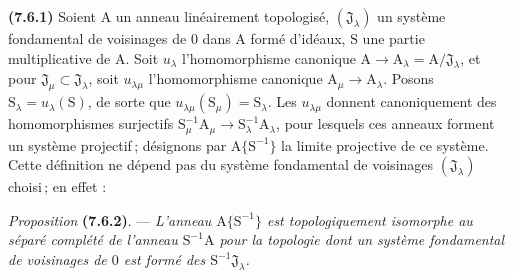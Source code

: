 \textbf{(7.6.1)} Soient $\mathrm{A}$ un anneau linéairement topologisé, $(\mathfrak{J}_\lambda)$ un système fondamental de voisinages de $0$ dans $\mathrm{A}$ formé d’idéaux, $\mathrm{S}$ une partie multiplicative de $\mathrm{A}$. Soit $u_\lambda$ l’homomorphisme canonique $\mathrm{A}\to \mathrm{A}_\lambda=\mathrm{A}/\mathfrak{J}_\lambda$, et pour $\mathfrak{J}_\mu\subset \mathfrak{J}_\lambda$, soit $u_{\lambda\mu}$ l’homomorphisme canonique $\mathrm{A}_\mu\to \mathrm{A}_\lambda$. Posons $\mathrm{S}_\lambda=u_\lambda(\mathrm{S})$, de sorte que $u_{\lambda\mu}(\mathrm{S}_\mu)=\mathrm{S}_\lambda$. Les $u_{\lambda\mu}$ donnent canoniquement des homomorphismes surjectifs $\mathrm{S}_\mu^{-1}\mathrm{A}_\mu\to \mathrm{S}_\lambda^{-1}\mathrm{A}_\lambda$, pour lesquels ces anneaux forment un système projectif\,; désignons par $\mathrm{A}\{\mathrm{S}^{-1}\}$ la limite projective de ce système. Cette définition ne dépend pas du système fondamental de voisinages $(\mathfrak{J}_\lambda)$ choisi\,; en effet :

\textit{Proposition} \textbf{(7.6.2)}. --- \textit{L’anneau $\mathrm{A}\{\mathrm{S}^{-1}\}$ est topologiquement isomorphe au séparé complété de l’anneau $\mathrm{S}^{-1}\mathrm{A}$ pour la topologie dont un système fondamental de voisinages de $0$ est formé des $\mathrm{S}^{-1}\mathfrak{J}_\lambda$.}
